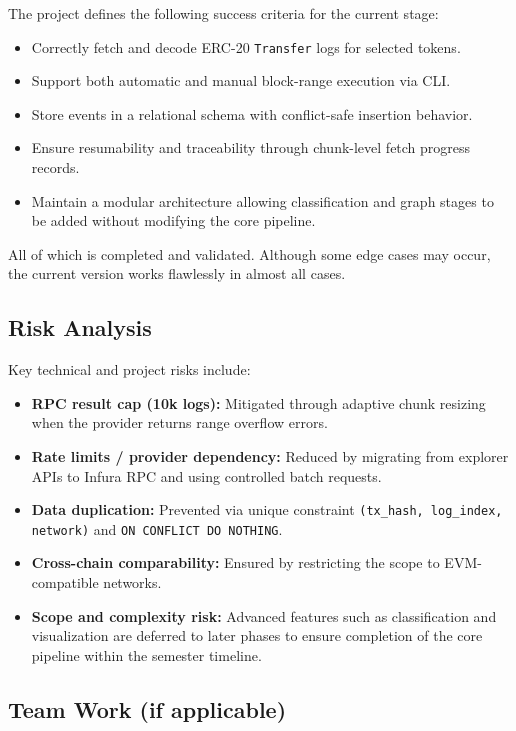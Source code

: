\documentclass[a4paper,12pt]{report}
\begin{document}
The project defines the following success criteria for the current stage:

\begin{itemize}
\item Correctly fetch and decode ERC-20 \texttt{Transfer} logs for selected tokens.
\item Support both automatic and manual block-range execution via CLI.
\item Store events in a relational schema with conflict-safe insertion behavior.
\item Ensure resumability and traceability through chunk-level fetch progress records.
\item Maintain a modular architecture allowing classification and graph stages to be added without modifying the core pipeline.
\end{itemize}

All of which is completed and validated. Although some edge cases may occur, the current version works flawlessly in almost all cases.

\subsection{Risk Analysis}

Key technical and project risks include:

\begin{itemize}
\item \textbf{RPC result cap (10k logs):} Mitigated through adaptive chunk resizing when the provider returns range overflow errors.
\item \textbf{Rate limits / provider dependency:} Reduced by migrating from explorer APIs to Infura RPC and using controlled batch requests.
\item \textbf{Data duplication:} Prevented via unique constraint \texttt{(tx\_hash, log\_index, network)} and \texttt{ON CONFLICT DO NOTHING}.
\item \textbf{Cross-chain comparability:} Ensured by restricting the scope to EVM-compatible networks.
\item \textbf{Scope and complexity risk:} Advanced features such as classification and visualization are deferred to later phases to ensure completion of the core pipeline within the semester timeline.
\end{itemize}

\subsection{Team Work (if applicable)}
\end{document}
